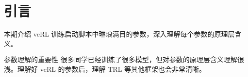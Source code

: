 \section{引言}
本期介绍 veRL 训练启动脚本中琳琅满目的参数，深入理解每个参数的原理层含义。

\begin{importantbox}{参数理解的重要性}
很多同学已经训练了很多模型，但对参数的原理层含义理解很浅。理解好 veRL 的参数后，理解 TRL 等其他框架也会非常清晰。
\end{importantbox}

